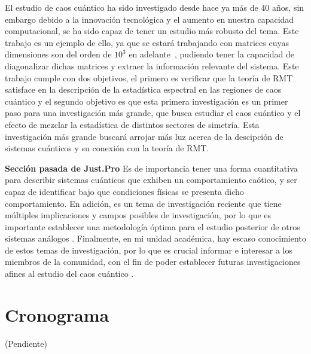 \documentclass[spanish,titlepage,table]{practicas}
\begin{document}
El estudio de caos cuántico ha sido investigado desde hace ya más de 40 años, sin embargo debido a la innovación tecnológica y el aumento en nuestra capacidad 
computacional, se ha sido capaz de tener un estudio más robusto del tema. Este trabajo es un ejemplo de ello, ya que 
se estará trabajando con matrices cuyas dimensiones son del orden de $10^{3}$ en adelante~\cite{Zhang2010}, 
pudiendo tener la capacidad de diagonalizar dichas matrices y extraer la información relevante del sistema.
Este trabajo cumple con dos objetivos, el primero es verificar que la teoría de RMT satisface en la descripción de la 
estadística espectral en las regiones de caos cuántico y el segundo objetivo es que esta primera investigación es 
un primer paso para una investigación más grande, que busca estudiar el caos cuántico y el efecto de mezclar la estadística 
de distintos sectores de simetría. Esta investigación más grande buscará arrojar más luz acerca de la descipción de sistemas cuánticos y su conexión con la teoría de RMT.

\textbf{Sección pasada de Just.Pro}
Es de importancia tener una forma cuantitativa para describir sistemas cuánticos que exhiben 
un comportamiento caótico, y ser capaz de identificar bajo que condiciones físicas se presenta 
dicho comportamiento. En adición, es un tema de investigación reciente que tiene múltiples implicaciones 
y campos posibles de investigación, por lo que es importante establecer una metodología óptima para el estudio posterior de otros sistemas análogos .
Finalmente, en mi unidad académica, hay escaso conocimiento de estos temas de investigación, por lo que 
es crucial informar e interesar a los miembros de la comunidad, con el fin de poder establecer 
futuras investigaciones afines al estudio del caos cuántico . 
\section{Cronograma}
(Pendiente)


\end{document}
